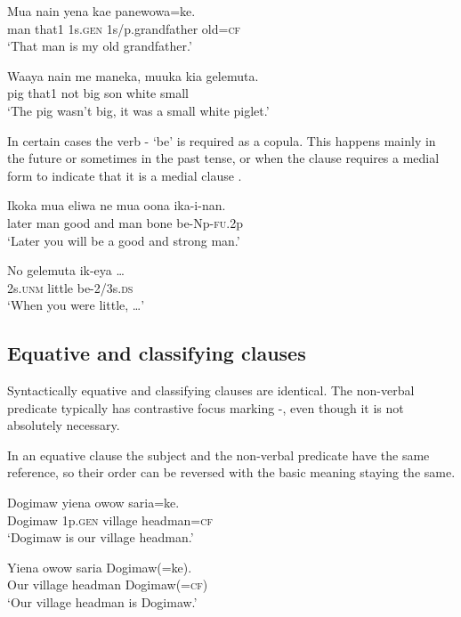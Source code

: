 \ea%
\label{ex:5:x1036}
\gll Mua  nain  yena  kae  panewowa=ke. \\
     man  that1  1s.\textsc{gen}  1s/p.grandfather  old=\textsc{cf} \\
\glt `That man is my old grandfather.'
\z

\ea%
\label{ex:5:x1037}
\gll Waaya  nain  me  maneka,  muuka  kia  gelemuta. \\
     pig  that1  not  big  son  white  small \\
\glt `The pig wasn't big, it was a small white piglet.'
\z

In certain cases the verb - `be' is required as a copula. This happens mainly in the future  or sometimes in the past tense, or when the clause requires a medial form to indicate that it is a medial clause . 

\ea%
\label{ex:5:x986}
\gll Ikoka  mua  eliwa  ne  mua  oona  ika-i-nan. \\
     later  man  good  and  man  bone  be-Np-\textsc{fu}.2p \\
\glt `Later you will be a good and strong man.'
\z

\ea%
\label{ex:5:x987}
\gll No  gelemuta  ik-eya  {\dots} \\
     2s.\textsc{unm}  little  be-2/3s.\textsc{ds} \\
\glt `When you were little, {\dots}'
\z

\subsection{Equative and classifying clauses} \label{sec:5.6.1}

Syntactically equative and classifying clauses are identical. The non-verbal predicate typically has contrastive focus marking -, even though it is not absolutely necessary. 

In an equative clause the subject and the non-verbal predicate have the same reference, so their order can be reversed with the basic meaning staying the same. 

\ea%
\label{ex:5:x975}
\gll Dogimaw  yiena  owow  saria=ke. \\
     Dogimaw  1p.\textsc{gen}  village  headman=\textsc{cf} \\
\glt `Dogimaw is our village headman.'
\z

\ea%
\label{ex:5:x976}
\gll Yiena  owow  saria  Dogimaw(=ke). \\
     Our  village  headman  Dogimaw(=\textsc{cf}) \\
\glt `Our village headman is Dogimaw.'
\z

